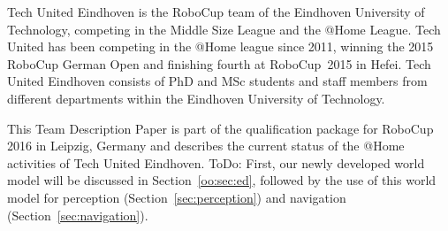 Tech United Eindhoven is the RoboCup team of the Eindhoven University of Technology, competing in the Middle Size League and the @Home League. Tech United has been competing in the @Home league since 2011, winning the 2015 RoboCup German Open and finishing fourth at RoboCup~2015 in Hefei. 
Tech United Eindhoven consists of PhD and MSc students and staff members from different departments within the Eindhoven University of Technology.

This Team Description Paper is part of the qualification package for RoboCup 2016 in Leipzig, Germany and describes the current status of the @Home activities of Tech United Eindhoven. ToDo: First, our newly developed world model will be discussed in Section~\ref{oo:sec:ed}, followed by the use of this world model for perception (Section~\ref{sec:perception}) and navigation (Section~\ref{sec:navigation}).
